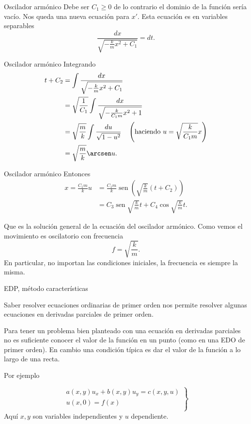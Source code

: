 \documentclass[handout,hyperref={colorlinks=true}]{beamer}
\DeclareMathOperator{\sen}{sen}
\begin{document}
\begin{frame}{Oscilador armónico}
Debe ser $C_1\geq 0$ de lo contrario el dominio de la función sería vacío. Nos queda una nueva ecuación para $x'$.
Esta ecuación es en variables separables
\[ \frac{dx}{\sqrt{-\frac{k}{m}x^2+C_1}}=dt.   
\]

\end{frame}

\begin{frame}{Oscilador armónico}
 Integrando
\[\begin{split}
   t+C_2 
   &=\int \frac{dx}{\sqrt{-\frac{k}{m}x^2+C_1}}\\
   &= \sqrt{\frac{1}{C_1}} \int \frac{dx}{\sqrt{-\frac{k}{C_1m}x^2+1}} \\  
   &= \sqrt{\frac{m}{k}} \int \frac{du}{\sqrt{1-u^2}}\quad \left(\text{haciendo } u=\sqrt{\frac{k}{C_1m}}x\right)\\ 
   &=\sqrt{\frac{m}{k}}\arcsen u.
  \end{split}
\]
\end{frame}

\begin{frame}{Oscilador armónico}
Entonces
\[\begin{split}
    x=\frac{C_1m}{k}u &=\frac{C_1m}{k}\sen \left(\sqrt{\frac{k}{m}}(t+C_2)\right)\\
    &=\boxed{C_3\sen \sqrt{\frac{k}{m}}t+C_4\cos \sqrt{\frac{k}{m}}t}.
  \end{split}
 \]

Que es la solución general de la ecuación del oscilador armónico. Como vemos el movimiento es oscilatorio con frecuencia
\[\boxed{f=\sqrt{\frac{k}{m}} }.\]
En particular, no importan las condiciones iniciales, la frecuencia es siempre la misma. 

 
 

\end{frame}

\begin{frame}{EDP, método características}

\onslide<+->Saber resolver ecuaciones ordinarias de primer orden nos permite resolver algunas ecuaciones en derivadas parciales de primer orden. 

\onslide<+->Para tener un problema bien planteado con una ecuación en derivadas parciales no es suficiente conocer el valor de la función en un punto (como en una EDO de primer orden). En cambio una condición típica es dar el valor de la función a lo largo de una recta. 

\onslide<+-> Por ejemplo

\begin{equation}\label{eq:EDP_gral_1orden}
  \left.\begin{array}{l}
  a(x,y)u_x+b(x,y)u_y=c(x,y,u)\\
  u(x,0)=f(x)\\
\end{array}\right\}
\end{equation}
Aquí $x,y$ son variables independientes y $u$ dependiente.


 

\end{frame}
\end{document}
